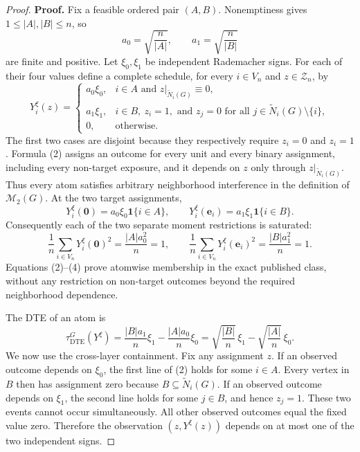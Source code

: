 \documentclass{article}
\begin{document}
\begin{proof}
\textbf{Proof.}
Fix a feasible ordered pair \((A,B)\).  Nonemptiness gives \(1\leq |A|,|B|\leq n\), so
\[
a_0=\sqrt{\frac{n}{|A|}},
\qquad
a_1=\sqrt{\frac{n}{|B|}}
\tag{1}
\]
are finite and positive.  Let \(\xi_0,\xi_1\) be independent Rademacher signs.  For each of their four values define a complete schedule, for every \(i\in V_n\) and \(z\in\mathcal Z_n\), by
\[
Y_i^{\xi}(z)=
\begin{cases}
a_0\xi_0,
& i\in A\text{ and }z|_{\widetilde N_i(G)}\equiv0,\\
a_1\xi_1,
& i\in B,\ z_i=1,\text{ and }z_j=0
   \text{ for all }j\in\widetilde N_i(G)\setminus\{i\},\\
0,&\text{otherwise}.
\end{cases}
\tag{2}
\]
The first two cases are disjoint because they respectively require \(z_i=0\) and \(z_i=1\).  Formula (2) assigns an outcome for every unit and every binary assignment, including every non-target exposure, and it depends on \(z\) only through \(z|_{\widetilde N_i(G)}\).  Thus every atom satisfies arbitrary neighborhood interference in the definition of \(\mathcal M_2(G)\).  At the two target assignments,
\[
Y_i^{\xi}(\mathbf 0)=a_0\xi_0\mathbf 1\{i\in A\},
\qquad
Y_i^{\xi}(\mathbf e_i)=a_1\xi_1\mathbf 1\{i\in B\}.
\tag{3}
\]
Consequently each of the two separate moment restrictions is saturated:
\[
\frac1n\sum_{i\in V_n}Y_i^{\xi}(\mathbf0)^2
=\frac{|A|a_0^2}{n}=1,
\qquad
\frac1n\sum_{i\in V_n}Y_i^{\xi}(\mathbf e_i)^2
=\frac{|B|a_1^2}{n}=1.
\tag{4}
\]
Equations (2)--(4) prove atomwise membership in the exact published class, without any restriction on non-target outcomes beyond the required neighborhood dependence.

The DTE of an atom is
\[
\tau_{\mathrm{DTE}}^G(Y^{\xi})
=\frac{|B|a_1}{n}\xi_1-\frac{|A|a_0}{n}\xi_0
=\sqrt{\frac{|B|}{n}}\,\xi_1
-\sqrt{\frac{|A|}{n}}\,\xi_0.
\tag{5}
\]
We now use the cross-layer containment.  Fix any assignment \(z\).  If an observed outcome depends on \(\xi_0\), the first line of (2) holds for some \(i\in A\).  Every vertex in \(B\) then has assignment zero because \(B\subseteq\widetilde N_i(G)\).  If an observed outcome depends on \(\xi_1\), the second line holds for some \(j\in B\), and hence \(z_j=1\).  These two events cannot occur simultaneously.  All other observed outcomes equal the fixed value zero.  Therefore the observation \((z,Y^{\xi}(z))\) depends on at most one of the two independent signs.


\end{proof}
\end{document}
